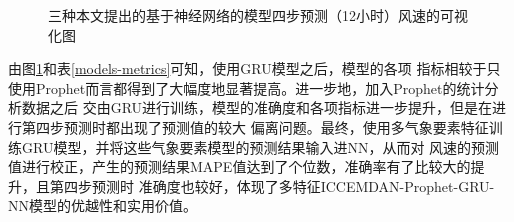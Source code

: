 \documentclass[AutoFakeBold]{LZUThesis}
\begin{document}
\begin{figure}[H]
	\centering
    \caption{三种本文提出的基于神经网络的模型四步预测（12小时）风速的可视化图}
    \label{fig_gru_predict_test}
\end{figure}

由图\ref{fig_gru_predict_test}和表\ref{models-metrics}可知，使用GRU模型之后，模型的各项
指标相较于只使用Prophet而言都得到了大幅度地显著提高。进一步地，加入Prophet的统计分析数据之后
交由GRU进行训练，模型的准确度和各项指标进一步提升，但是在进行第四步预测时都出现了预测值的较大
偏离问题。最终，使用多气象要素特征训练GRU模型，并将这些气象要素模型的预测结果输入进NN，从而对
风速的预测值进行校正，产生的预测结果MAPE值达到了个位数，准确率有了比较大的提升，且第四步预测时
准确度也较好，体现了多特征ICCEMDAN-Prophet-GRU-NN模型的优越性和实用价值。
\end{document}
